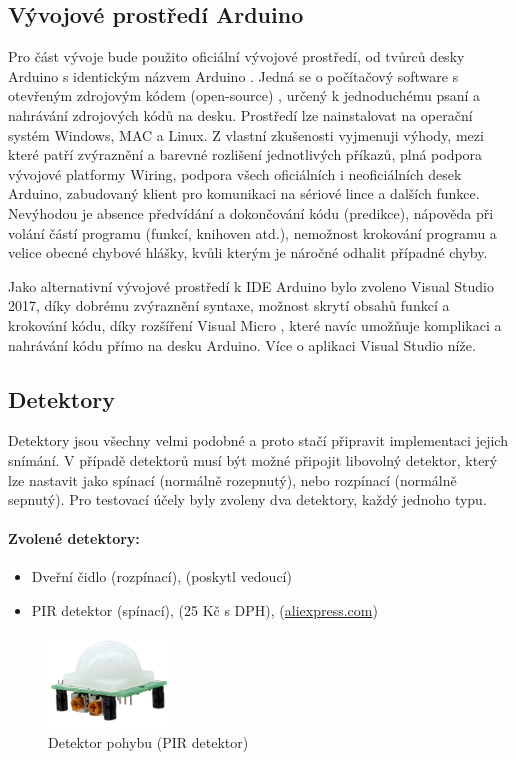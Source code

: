 \documentclass[FM,DP]{tulthesis}  %
\begin{document}
\subsection{Vývojové prostředí Arduino}
Pro část vývoje bude použito oficiální vývojové prostředí, od tvůrců desky Arduino s identickým názvem Arduino \cite{Arduino soft}. Jedná se o počítačový software s otevřeným zdrojovým kódem (open-source) \cite{Arduino source}, určený k jednoduchému psaní a nahrávání zdrojových kódů na desku. Prostředí lze nainstalovat na operační systém Windows, MAC a Linux. Z vlastní zkušenosti vyjmenuji výhody, mezi které patří zvýraznění a barevné rozlišení jednotlivých příkazů, plná podpora vývojové platformy Wiring, podpora všech oficiálních i neoficiálních desek Arduino, zabudovaný klient pro komunikaci na sériové lince a dalších funkce. Nevýhodou je absence předvídání a dokončování kódu (predikce), nápověda při volání částí programu (funkcí, knihoven atd.), nemožnost krokování programu a velice obecné chybové hlášky, kvůli kterým je náročné odhalit případné chyby.

Jako alternativní vývojové prostředí k IDE Arduino bylo zvoleno Visual Studio 2017, díky dobrému zvýraznění syntaxe, možnost skrytí obsahů funkcí a krokování kódu, díky rozšíření Visual Micro \cite{Visual Micro}, které navíc umožňuje komplikaci a nahrávání kódu přímo na desku Arduino. Více o aplikaci Visual Studio níže.

\subsection{Detektory}
Detektory jsou všechny velmi podobné a proto stačí připravit implementaci jejich snímání. V případě detektorů musí být možné připojit libovolný detektor, který lze nastavit jako spínací (normálně rozepnutý), nebo rozpínací (normálně sepnutý). Pro testovací účely byly zvoleny dva detektory, každý jednoho typu.

\paragraph{Zvolené detektory:}
\begin{itemize}
\item Dveřní čidlo (rozpínací), (poskytl vedoucí)
\item PIR detektor (spínací), (25 Kč s DPH), (\url{aliexpress.com})
\end{itemize} 

\begin{figure}[H]
\begin{center}
\includegraphics[width=0.3\textwidth]{images/PIR.jpg}
\caption{Detektor pohybu (PIR detektor)}
\label{image}
\end{center}
\end{figure}
\end{document}
